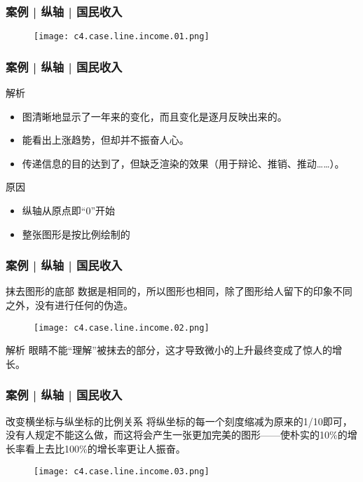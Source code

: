 \begin{frame}
  \frametitle{案例 | 纵轴 | 国民收入}
  \begin{figure}
    \centering
    \texttt{[image: c4.case.line.income.01.png]}
  \end{figure}
\end{frame}

\begin{frame}
  \frametitle{案例 | 纵轴 | 国民收入}
  \begin{block}{解析}
    \begin{itemize}
      \item 图清晰地显示了一年来的变化，而且变化是逐月反映出来的。
      \item 能看出上涨趋势，但却并不振奋人心。
      \item 传递信息的目的达到了，但缺乏渲染的效果（用于辩论、推销、推动……）。
    \end{itemize}
  \end{block}
  \pause
  \begin{block}{原因}
    \begin{itemize}
      \item 纵轴从原点即“0”开始
      \item 整张图形是按比例绘制的
    \end{itemize}
  \end{block}
\end{frame}

\begin{frame}
  \frametitle{案例 | 纵轴 | 国民收入}
  \begin{block}{抹去图形的底部}
    数据是相同的，所以图形也相同，除了图形给人留下的印象不同之外，没有进行任何的伪造。
  \end{block}
  \vspace{-0.5em}
  \begin{figure}
    \centering
    \texttt{[image: c4.case.line.income.02.png]}
  \end{figure}
  \pause
  \vspace{-0.5em}
  \begin{block}{解析}
    眼睛不能“理解”被抹去的部分，这才导致微小的上升最终变成了惊人的增长。
  \end{block}
\end{frame}

\begin{frame}
  \frametitle{案例 | 纵轴 | 国民收入}
  \begin{block}{改变横坐标与纵坐标的比例关系}
    将纵坐标的每一个刻度缩减为原来的1/10即可，没有人规定不能这么做，而这将会产生一张更加完美的图形——使朴实的10\%的增长率看上去比100\%的增长率更让人振奋。
  \end{block}
  \vspace{-0.5em}
  \begin{figure}
    \centering
    \texttt{[image: c4.case.line.income.03.png]}
  \end{figure}
\end{frame}

